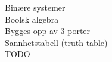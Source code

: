 Binære systemer \\
Boolsk algebra \\
Bygges opp av 3 porter \\
Sannhetstabell (truth table) \\
TODO
